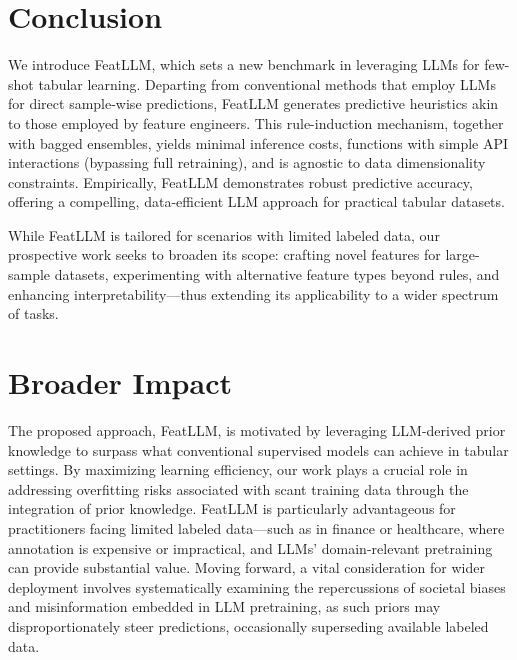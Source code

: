 \section{Conclusion}
We introduce \textsf{FeatLLM}, which sets a new benchmark in leveraging LLMs for few-shot tabular learning. Departing from conventional methods that employ LLMs for direct sample-wise predictions, \textsf{FeatLLM} generates predictive heuristics akin to those employed by feature engineers. This rule-induction mechanism, together with bagged ensembles, yields minimal inference costs, functions with simple API interactions (bypassing full retraining), and is agnostic to data dimensionality constraints. Empirically, \textsf{FeatLLM} demonstrates robust predictive accuracy, offering a compelling, data-efficient LLM approach for practical tabular datasets.

While \textsf{FeatLLM} is tailored for scenarios with limited labeled data, our prospective work seeks to broaden its scope: crafting novel features for large-sample datasets, experimenting with alternative feature types beyond rules, and enhancing interpretability—thus extending its applicability to a wider spectrum of tasks.

\section{Broader Impact}
The proposed approach, \textsf{FeatLLM}, is motivated by leveraging LLM-derived prior knowledge to surpass what conventional supervised models can achieve in tabular settings. By maximizing learning efficiency, our work plays a crucial role in addressing overfitting risks associated with scant training data through the integration of prior knowledge. \textsf{FeatLLM} is particularly advantageous for practitioners facing limited labeled data—such as in finance or healthcare, where annotation is expensive or impractical, and LLMs' domain-relevant pretraining can provide substantial value. Moving forward, a vital consideration for wider deployment involves systematically examining the repercussions of societal biases and misinformation embedded in LLM pretraining, as such priors may disproportionately steer predictions, occasionally superseding available labeled data.

